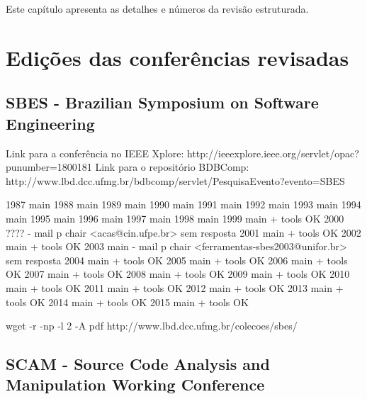 {Este capítulo apresenta as detalhes e números da revisão estruturada.}
\label{apendice-revisao-estruturada}

\section{Edições das conferências revisadas}
\label{edicoes-conferencias}

\subsection{SBES - Brazilian Symposium on Software Engineering}

Link para a conferência no IEEE Xplore: http://ieeexplore.ieee.org/servlet/opac?punumber=1800181
Link para o repositório BDBComp: http://www.lbd.dcc.ufmg.br/bdbcomp/servlet/PesquisaEvento?evento=SBES

1987 main
1988 main
1989 main
1990 main
1991 main
1992 main
1993 main
1994 main
1995 main
1996 main
1997 main
1998 main
1999 main + tools OK
2000 ???? - mail p chair <acas@cin.ufpe.br> sem resposta 
2001 main + tools OK
2002 main + tools OK
2003 main - mail p chair <ferramentas-sbes2003@unifor.br> sem resposta
2004 main + tools OK
2005 main + tools OK
2006 main + tools OK
2007 main + tools OK
2008 main + tools OK
2009 main + tools OK
2010 main + tools OK
2011 main + tools OK
2012 main + tools OK
2013 main + tools OK
2014 main + tools OK
2015 main + tools OK

wget -r -np -l 2 -A pdf http://www.lbd.dcc.ufmg.br/colecoes/sbes/

\subsection{SCAM - Source Code Analysis and Manipulation Working Conference}

